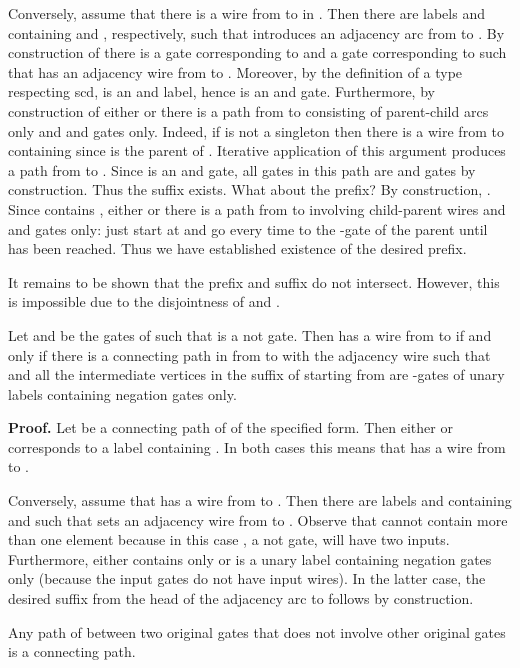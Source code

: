 \documentclass{llncs}
\begin{document}
Conversely, assume that there is a wire from  to  in . Then there are labels  and  containing 
 and , respectively, such that  introduces an adjacency arc from  to . By construction of  there is a gate  corresponding to  and a gate  corresponding to  such that  has an adjacency wire from  to . Moreover, by the definition of a type respecting {\sc scd},  is
an {\sc and} label, hence  is an {\sc and} gate. Furthermore, by construction of 
either  or there is a path from  to  consisting of parent-child arcs only and {\sc and} gates only. Indeed, if  is not a singleton then there is a wire from  to  containing  since  is the parent of . Iterative application of this argument produces a path from  to . Since  is an {\sc and} gate, all gates in this path are 
{\sc and} gates by construction.  Thus the suffix exists. What about the prefix?
By construction, . Since  contains ,
either  or there is a path from  to  involving child-parent wires and {\sc and} gates only: just start at  and go every time to the -gate of the parent
until  has been reached. Thus we have established existence of the desired prefix.

It remains to be shown that the prefix and suffix do not intersect. However, this is impossible due to the disjointness of  and . 




\begin{lemma} \label{notconnect}
Let  and  be the gates of  such that  is a {\sc not} gate. Then  has a wire from  to  if and only if 
there is a connecting path  in  from  to  with the adjacency wire  such that  and all the intermediate vertices in the suffix of  
starting from  are -gates of unary labels containing negation gates only.
\end{lemma}

{\bf Proof.}
Let  be a connecting path of  of the specified form. Then either  or  corresponds to a label containing . In both cases this means that  has a wire from  to .

Conversely, assume that  has a wire from  to .
Then there are labels  and  containing  and  such that  sets an adjacency wire from  to . Observe that  cannot contain more than one element because in this case , a {\sc not} gate, will have two inputs. Furthermore, either  contains  only or  is a unary label containing negation gates only
(because the input gates do not have input wires). In the latter case, the desired suffix from the head of the adjacency arc to  follows by construction.  


\begin{lemma} \label{ubconnect}
Any path of  between two original gates that does not involve other original gates is a connecting path.
\end{lemma}
\end{document}
